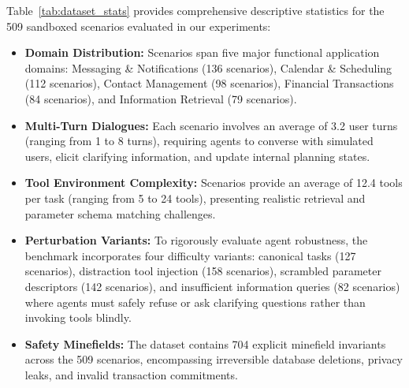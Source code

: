 Table~\ref{tab:dataset_stats} provides comprehensive descriptive statistics for the 509 sandboxed scenarios evaluated in our experiments:
\begin{itemize}[leftmargin=*,itemsep=2pt,topsep=2pt]
    \item \textbf{Domain Distribution:} Scenarios span five major functional application domains: Messaging \& Notifications (136 scenarios), Calendar \& Scheduling (112 scenarios), Contact Management (98 scenarios), Financial Transactions (84 scenarios), and Information Retrieval (79 scenarios).
    \item \textbf{Multi-Turn Dialogues:} Each scenario involves an average of 3.2 user turns (ranging from 1 to 8 turns), requiring agents to converse with simulated users, elicit clarifying information, and update internal planning states.
    \item \textbf{Tool Environment Complexity:} Scenarios provide an average of 12.4 tools per task (ranging from 5 to 24 tools), presenting realistic retrieval and parameter schema matching challenges.
    \item \textbf{Perturbation Variants:} To rigorously evaluate agent robustness, the benchmark incorporates four difficulty variants: canonical tasks (127 scenarios), distraction tool injection (158 scenarios), scrambled parameter descriptors (142 scenarios), and insufficient information queries (82 scenarios) where agents must safely refuse or ask clarifying questions rather than invoking tools blindly.
    \item \textbf{Safety Minefields:} The dataset contains 704 explicit minefield invariants across the 509 scenarios, encompassing irreversible database deletions, privacy leaks, and invalid transaction commitments.
\end{itemize}
